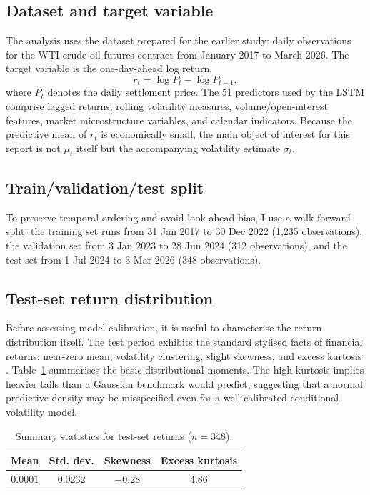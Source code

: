 \documentclass[%
 amsmath,amssymb,
 aps,
 pra,
 floatfix,
 raggedbottom,
 nofootinbib,
12pt,]{revtex4-2}
\begin{document}
\subsection{Dataset and target variable}

The analysis uses the dataset prepared for the earlier study: daily observations for the WTI crude oil futures contract from January 2017 to March 2026.
The target variable is the one-day-ahead log return,
\begin{equation}
    r_t = \log P_t - \log P_{t-1},
\end{equation}
where $P_t$ denotes the daily settlement price.
The 51 predictors used by the LSTM comprise lagged returns, rolling volatility measures, volume/open-interest features, market microstructure variables, and calendar indicators.
Because the predictive mean of $r_t$ is economically small, the main object of interest for this report is not $\mu_t$ itself but the accompanying volatility estimate $\sigma_t$.

\subsection{Train/validation/test split}

To preserve temporal ordering and avoid look-ahead bias, I use a walk-forward split: the training set runs from 31 Jan 2017 to 30 Dec 2022 (1,235 observations), the validation set from 3 Jan 2023 to 28 Jun 2024 (312 observations), and the test set from 1 Jul 2024 to 3 Mar 2026 (348 observations).

\subsection{Test-set return distribution}

Before assessing model calibration, it is useful to characterise the return distribution itself.
The test period exhibits the standard stylised facts of financial returns: near-zero mean, volatility clustering, slight skewness, and excess kurtosis \citep{cont2001empirical}.
Table~\ref{tab:test_stats} summarises the basic distributional moments.
The high kurtosis implies heavier tails than a Gaussian benchmark would predict, suggesting that a normal predictive density may be misspecified even for a well-calibrated conditional volatility model.

\begin{table}[htbp]
\centering
\caption{Summary statistics for test-set returns ($n = 348$).}
\label{tab:test_stats}
\begin{ruledtabular}
\begin{tabular}{cccc}
\textbf{Mean} & \textbf{Std. dev.} & \textbf{Skewness} & \textbf{Excess kurtosis} \\
\hline
$0.0001$ & $0.0232$ & $-0.28$ & $4.86$ \\
\end{tabular}
\end{ruledtabular}
\end{table}
\end{document}
